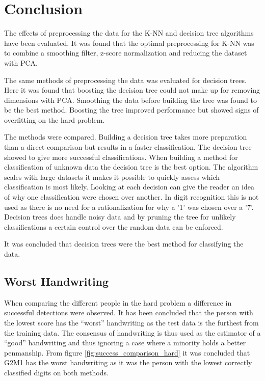 \section{Conclusion}

The effects of preprocessing the data for the K-NN and decision tree algorithms have been evaluated.
It was found that the optimal preprocessing for K-NN was to combine a smoothing filter, z-score normalization and reducing the dataset with PCA.

The same methods of preprocessing the data was evaluated for decision trees. 
Here it was found that boosting the decision tree could not make up for removing dimensions with PCA.
Smoothing the data before building the tree was found to be the best method.
Boosting the tree improved performance but showed signs of overfitting on the hard problem.

The methods were compared. 
Building a decision tree takes more preparation than a direct comparison but results in a faster classification.
The decision tree showed to give more successful classifications.
When building a method for classification of unknown data the decision tree is the best option.
The algorithm scales with large datasets it makes it possible to quickly assess which classification is most likely.
Looking at each decision can give the reader an idea of why one classification were chosen over another.
In digit recognition this is not used as there is no need for a rationalization for why a '1' was chosen over a '7'. 
Decision trees does handle noisy data and by pruning the tree for unlikely classifications a certain control over the random data can be enforced.

It was concluded that decision trees were the best method for classifying the data. 

\subsection{Worst Handwriting}

When comparing the different people in the hard problem a difference in successful detections were observed.
It has been concluded that the person with the lowest score has the ``worst'' handwriting as the test data is the furthest from the training data.
The consensus of handwriting is thus used as the estimator of a ``good'' handwriting and thus ignoring a case where a minority holds a better penmanship.
From figure \ref{fig:success_comparison_hard} it was concluded that 
G2M1
has the worst handwriting as it was the person with the lowest correctly classified digits on both methods.